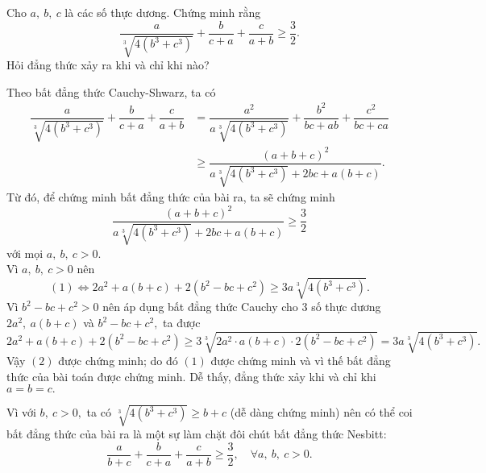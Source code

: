 \begin{bt}%
	Cho $a,\ b,\ c$ là các số thực dương. Chứng minh rằng
	\[\dfrac{a}{\sqrt[3]{4(b^3+c^3)}}+\dfrac{b}{c+a}+\dfrac{c}{a+b} \geq \dfrac{3}{2}.\]
	Hỏi đẳng thức xảy ra khi và chỉ khi nào?
	\loigiai
	{Theo bất đẳng thức Cauchy-Shwarz, ta có
		{\allowdisplaybreaks
		\begin{align*}
	\dfrac{a}{\sqrt[3]{4(b^3+c^3)}}+\dfrac{b}{c+a}+\dfrac{c}{a+b}
		&=\dfrac{a^2}{a \sqrt[3]{4(b^3+c^3)}}+\dfrac{b^2}{bc+ab}+\dfrac{c^2}{bc+ca}\\
		&\geq \dfrac{(a+b+c)^2}{a \sqrt[3]{4(b^3+c^3)}+2bc+a(b+c)}.
		\end{align*}}Từ đó, để chứng minh bất đẳng thức của bài ra, ta sẽ chứng minh 
	\[\dfrac{(a+b+c)^2}{a \sqrt[3]{4(b^3+c^3)}+2bc+a(b+c)}\geq \dfrac{3}{2} \tag{1}\]
		với mọi $a,\ b,\ c >0.$\\
		Vì $a,\ b,\ c > 0$ nên
		\[(1)\Leftrightarrow 2a^2 +a(b+c) +2(b^2-bc+c^2) \geq 3a \sqrt[3]{4(b^3+c^3)}. \tag{2}
		\]
		Vì $b^2-bc+c^2>0$ nên áp dụng bất đẳng thức Cauchy cho 3 số thực dương $2a^2,\ a(b+c)$ và $b^2-bc+c^2,$ ta được
		\[2a^2+a(b+c)+2(b^2-bc+c^2) \geq 3 \sqrt[3]{2a^2\cdot a(b+c)\cdot 2(b^2-bc+c^2)}=3a \sqrt[3]{4(b^3+c^3)}.\]
Vậy 		$(2)$ được chứng minh; do đó $(1)$ được chứng minh và vì thế bất đẳng thức của bài toán được chứng minh.
		Dễ thấy, đẳng thức xảy khi và chỉ khi $a=b=c.$
		\begin{nx}
			Vì với $b,\ c >0,$ ta có $\sqrt[3]{4(b^3+c^3)} \geq b+c$ (dễ dàng chứng minh) nên có thể coi bất đẳng thức của bài ra là một sự làm chặt đôi chút bất đẳng thức Nesbitt:
			\[\dfrac{a}{b+c}+\dfrac{b}{c+a}+\dfrac{c}{a+b}\geq \dfrac{3}{2},\quad \forall a,\ b,\ c >0.\]
		\end{nx}
	}
\end{bt}
